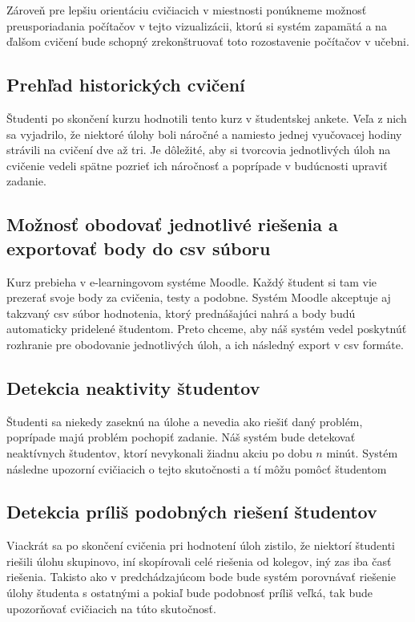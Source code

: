Zároveň pre lepšiu orientáciu cvičiacich v miestnosti ponúkneme možnosť
preusporiadania počítačov v tejto vizualizácii, ktorú si systém zapamätá a
na ďalšom cvičení bude schopný zrekonštruovať toto rozostavenie počítačov v učebni.

\subsection{Prehľad historických cvičení}
\label{sec:apprequirements:overview}

Študenti po skončení kurzu hodnotili tento kurz v študentskej ankete. Veľa z nich
sa vyjadrilo, že niektoré úlohy boli náročné a namiesto jednej vyučovacej hodiny
strávili na cvičení dve až tri.
Je dôležité, aby si tvorcovia jednotlivých úloh na cvičenie vedeli spätne pozrieť
ich náročnosť a poprípade v budúcnosti upraviť zadanie.

\subsection{Možnosť obodovať jednotlivé riešenia a exportovať body do csv súboru}
\label{sec:apprequirements:export}

Kurz prebieha v e-learningovom systéme Moodle. Každý študent si tam vie prezerať
svoje body za cvičenia, testy a podobne. Systém Moodle akceptuje aj takzvaný
csv súbor hodnotenia, ktorý prednášajúci nahrá a body budú automaticky pridelené
študentom. Preto chceme, aby náš systém vedel poskytnúť rozhranie pre obodovanie
jednotlivých úloh, a ich následný export v csv formáte.

\subsection{Detekcia neaktivity študentov}
\label{sec:apprequirements:noactivity}

Študenti sa niekedy zaseknú na úlohe a nevedia ako riešiť daný problém, poprípade
majú problém pochopiť zadanie. Náš systém bude detekovať neaktívnych študentov, ktorí
nevykonali žiadnu akciu po dobu $n$ minút. Systém následne upozorní cvičiacich o tejto
skutočnosti a tí môžu pomôcť študentom

\subsection{Detekcia príliš podobných riešení študentov}
\label{sec:apprequirements:similarsolutions}

Viackrát sa po skončení cvičenia pri hodnotení úloh zistilo, že niektorí študenti
riešili úlohu skupinovo, iní skopírovali celé riešenia od kolegov, iný zas iba časť
riešenia. Takisto ako v predchádzajúcom bode bude systém porovnávať riešenie úlohy
študenta s ostatnými a pokiaľ bude podobnosť príliš veľká, tak bude upozorňovať
cvičiacich na túto skutočnosť.